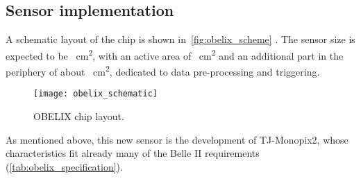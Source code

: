 \subsection{Sensor implementation}

A schematic layout of the chip is shown in~\autoref{fig:obelix_scheme} . The sensor size is expected to be ~\unit{cm^{2}}, with an active area of ~\unit{cm^{2}} and an additional part in the periphery of about ~\unit{cm^{2}}, dedicated to data pre-processing and triggering.

\begin{figure}[h!]
\centering
\texttt{[image: obelix\_schematic]}
\caption{OBELIX chip layout.}
\label{fig:obelix_scheme}
\end{figure}

As mentioned above, this new sensor is the development of TJ-Monopix2, whose characteristics fit already many of the Belle II requirements (\autoref{tab:obelix_specification}).\\


